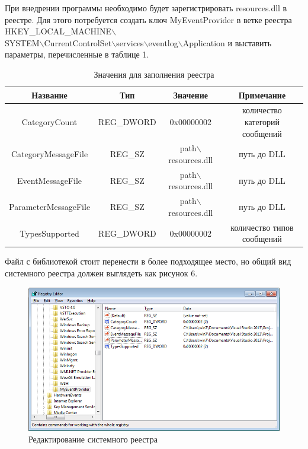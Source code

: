 \documentclass[a4paper, 12pt]{report}		%
\begin{document}
При внедрении программы необходимо будет зарегистрировать resources.dll в реестре. Для этого потребуется создать ключ MyEventProvider в ветке реестра HKEY\_LOCAL\_MACHINE$\backslash$\\
SYSTEM$\backslash$CurrentControlSet$\backslash$services$\backslash$eventlog$\backslash$Application и выставить параметры, перечисленные в таблице 1.

\begin{table}[htb]
\begin{tabular}{|c|c|c|c|}
\hline 
Название & Тип & Значение & Примечание \\ 
\hline 
CategoryCount & REG{\_}DWORD & 0x00000002 & количество категорий сообщений \\ 
\hline 
CategoryMessageFile & REG{\_}SZ & path$\backslash$resources.dll & путь до DLL \\ 
\hline 
EventMessageFile & REG{\_}SZ & path$\backslash$resources.dll & путь до DLL \\ 
\hline 
ParameterMessageFile & REG{\_}SZ & path$\backslash$resources.dll & путь до DLL \\ 
\hline 
TypesSupported & REG{\_}DWORD & 0x00000002 & количество типов сообщений \\ 
\hline 
\end{tabular} 
\caption{Значения для заполнения реестра}
\end{table}

Файл с библиотекой стоит перенести в более подходящее место, но общий вид системного реестра должен выглядеть как рисунок 6.

\begin{figure}[h!]
\centering
\includegraphics[scale=0.8]{res/reg}
\caption{Редактирование системного реестра}
\end{figure}
\end{document}
